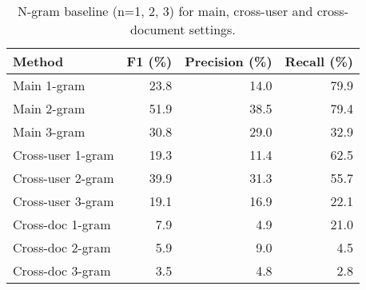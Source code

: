 \begin{table}[]
\caption{N-gram baseline (n=1, 2, 3) for main, cross-user and cross-document settings.}
\label{tab:n-gram}
\begin{tabular}{lrrr}
\toprule
Method            & F1 (\%) & Precision (\%) & Recall (\%) \\ \midrule
Main 1-gram       & 23.8    & 14.0           & 79.9        \\
Main 2-gram       & 51.9    & 38.5           & 79.4        \\
Main 3-gram       & 30.8    & 29.0           & 32.9        \\ \hline
Cross-user 1-gram & 19.3    & 11.4           & 62.5        \\
Cross-user 2-gram & 39.9    & 31.3           & 55.7        \\
Cross-user 3-gram & 19.1    & 16.9           & 22.1        \\ \hline
Cross-doc 1-gram  & 7.9     & 4.9            & 21.0        \\
Cross-doc 2-gram  & 5.9     & 9.0            & 4.5         \\
Cross-doc 3-gram  & 3.5     & 4.8            & 2.8         \\
\bottomrule
\end{tabular}
\end{table}
